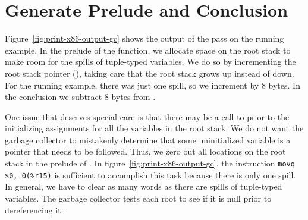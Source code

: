 \documentclass[7x10]{TimesAPriori_MIT}%
\numberwithin{theorem}{chapter}
\numberwithin{definition}{chapter}
\numberwithin{equation}{chapter}
\begin{document}
%




\section{Generate Prelude and Conclusion}
\label{sec:print-x86-gc}
\label{sec:prelude-conclusion-x86-gc}

Figure~\ref{fig:print-x86-output-gc} shows the output of the
 pass on the running example. In the
prelude of the  function, we allocate space
on the root stack to make room for the spills of tuple-typed
variables. We do so by incrementing the root stack pointer (),
taking care that the root stack grows up instead of down.  For the
running example, there was just one spill, so we increment 
by 8 bytes. In the conclusion we subtract 8 bytes from .

One issue that deserves special care is that there may be a call to
 prior to the initializing assignments for all the
variables in the root stack. We do not want the garbage collector to
mistakenly determine that some uninitialized variable is a pointer that
needs to be followed. Thus, we zero out all locations on the root
stack in the prelude of . In
figure~\ref{fig:print-x86-output-gc}, the instruction
%
\lstinline{movq $0, 0(%r15)}
%
is sufficient to accomplish this task because there is only one spill.
In general, we have to clear as many words as there are spills of
tuple-typed variables. The garbage collector tests each root to see
if it is null prior to dereferencing it. 
\end{document}
